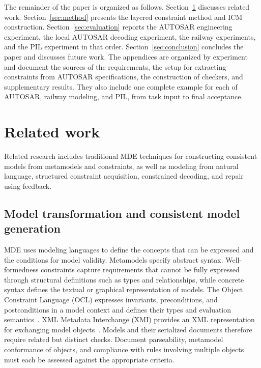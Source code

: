 \documentclass[pdflatex,iicol,sn-mathphys-num]{sn-jnl}
\newcommand{\paperref}[1]{~\citep{#1}}
\begin{document}
The remainder of the paper is organized as follows. Section~\ref{sec:related} discusses related work. Section~\ref{sec:method} presents the layered constraint method and ICM construction. Section~\ref{sec:evaluation} reports the AUTOSAR engineering experiment, the local AUTOSAR decoding experiment, the railway experiments, and the PIL experiment in that order. Section~\ref{sec:conclusion} concludes the paper and discusses future work. The appendices are organized by experiment and document the sources of the requirements, the setup for extracting constraints from AUTOSAR specifications, the construction of checkers, and supplementary results. They also include one complete example for each of AUTOSAR, railway modeling, and PIL, from task input to final acceptance.


\section{Related work}\label{sec:related}

Related research includes traditional MDE techniques for constructing consistent models from metamodels and constraints, as well as modeling from natural language, structured constraint acquisition, constrained decoding, and repair using feedback.

\subsection{Model transformation and consistent model generation}\label{sec:related-2-1}

MDE uses modeling languages to define the concepts that can be expressed and the conditions for model validity. Metamodels specify abstract syntax. Well-formedness constraints capture requirements that cannot be fully expressed through structural definitions such as types and relationships, while concrete syntax defines the textual or graphical representation of models. The Object Constraint Language (OCL) expresses invariants, preconditions, and postconditions in a model context and defines their types and evaluation semantics\paperref{OMG2014OCL24}. XML Metadata Interchange (XMI) provides an XML representation for exchanging model objects\paperref{OMG2015XMI251}. Models and their serialized documents therefore require related but distinct checks. Document parseability, metamodel conformance of objects, and compliance with rules involving multiple objects must each be assessed against the appropriate criteria.
\end{document}
